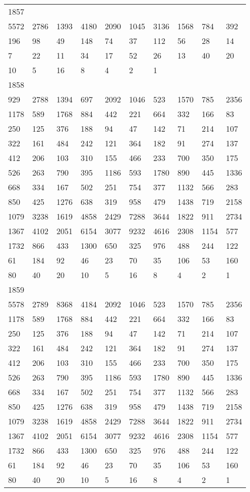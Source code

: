 \begin{longtable}{*{10}{l}}
1857&&&&&&&&&\\
5572& 2786& 1393& 4180& 2090& 1045& 3136& 1568& 784& 392\\
196& 98& 49& 148& 74& 37& 112& 56& 28& 14\\
7& 22& 11& 34& 17& 52& 26& 13& 40& 20\\
10& 5& 16& 8& 4& 2& 1& \\

1858&&&&&&&&&\\
929& 2788& 1394& 697& 2092& 1046& 523& 1570& 785& 2356\\
1178& 589& 1768& 884& 442& 221& 664& 332& 166& 83\\
250& 125& 376& 188& 94& 47& 142& 71& 214& 107\\
322& 161& 484& 242& 121& 364& 182& 91& 274& 137\\
412& 206& 103& 310& 155& 466& 233& 700& 350& 175\\
526& 263& 790& 395& 1186& 593& 1780& 890& 445& 1336\\
668& 334& 167& 502& 251& 754& 377& 1132& 566& 283\\
850& 425& 1276& 638& 319& 958& 479& 1438& 719& 2158\\
1079& 3238& 1619& 4858& 2429& 7288& 3644& 1822& 911& 2734\\
1367& 4102& 2051& 6154& 3077& 9232& 4616& 2308& 1154& 577\\
1732& 866& 433& 1300& 650& 325& 976& 488& 244& 122\\
61& 184& 92& 46& 23& 70& 35& 106& 53& 160\\
80& 40& 20& 10& 5& 16& 8& 4& 2& 1\\

1859&&&&&&&&&\\
5578& 2789& 8368& 4184& 2092& 1046& 523& 1570& 785& 2356\\
1178& 589& 1768& 884& 442& 221& 664& 332& 166& 83\\
250& 125& 376& 188& 94& 47& 142& 71& 214& 107\\
322& 161& 484& 242& 121& 364& 182& 91& 274& 137\\
412& 206& 103& 310& 155& 466& 233& 700& 350& 175\\
526& 263& 790& 395& 1186& 593& 1780& 890& 445& 1336\\
668& 334& 167& 502& 251& 754& 377& 1132& 566& 283\\
850& 425& 1276& 638& 319& 958& 479& 1438& 719& 2158\\
1079& 3238& 1619& 4858& 2429& 7288& 3644& 1822& 911& 2734\\
1367& 4102& 2051& 6154& 3077& 9232& 4616& 2308& 1154& 577\\
1732& 866& 433& 1300& 650& 325& 976& 488& 244& 122\\
61& 184& 92& 46& 23& 70& 35& 106& 53& 160\\
80& 40& 20& 10& 5& 16& 8& 4& 2& 1\\


\end{longtable}
